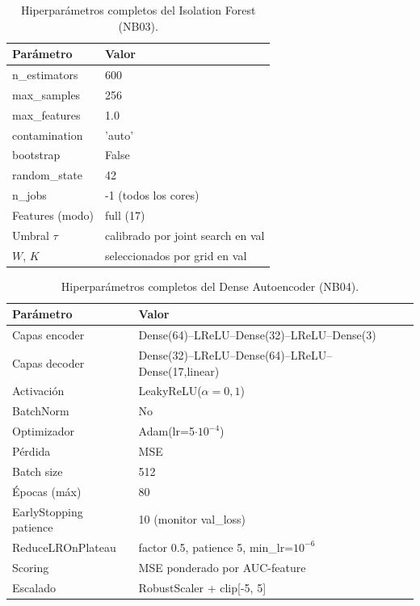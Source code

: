 \begin{table}[H]
\centering
\caption{Hiperparámetros completos del Isolation Forest (NB03).}
\label{tab:hp-if}
\small
\begin{tabularx}{0.7\textwidth}{l l}
\toprule
Parámetro & Valor \\
\midrule
n\_estimators        & 600 \\
max\_samples         & 256 \\
max\_features        & 1.0 \\
contamination        & 'auto' \\
bootstrap            & False \\
random\_state        & 42 \\
n\_jobs              & -1 (todos los cores) \\
Features (modo)      & full (17) \\
Umbral $\tau$        & calibrado por joint search en val \\
$W$, $K$             & seleccionados por grid en val \\
\bottomrule
\end{tabularx}
\end{table}

\begin{table}[H]
\centering
\caption{Hiperparámetros completos del Dense Autoencoder (NB04).}
\label{tab:hp-dae}
\small
\begin{tabularx}{0.8\textwidth}{l l}
\toprule
Parámetro & Valor \\
\midrule
Capas encoder           & Dense(64)–LReLU–Dense(32)–LReLU–Dense(3) \\
Capas decoder           & Dense(32)–LReLU–Dense(64)–LReLU–Dense(17,linear) \\
Activación              & LeakyReLU($\alpha=0{,}1$) \\
BatchNorm               & No \\
Optimizador             & Adam(lr=5$\cdot 10^{-4}$) \\
Pérdida                 & MSE \\
Batch size              & 512 \\
Épocas (máx)            & 80 \\
EarlyStopping patience  & 10 (monitor val\_loss) \\
ReduceLROnPlateau       & factor 0.5, patience 5, min\_lr=$10^{-6}$ \\
Scoring                 & MSE ponderado por AUC-feature \\
Escalado                & RobustScaler + clip[-5, 5] \\
\bottomrule
\end{tabularx}
\end{table}

